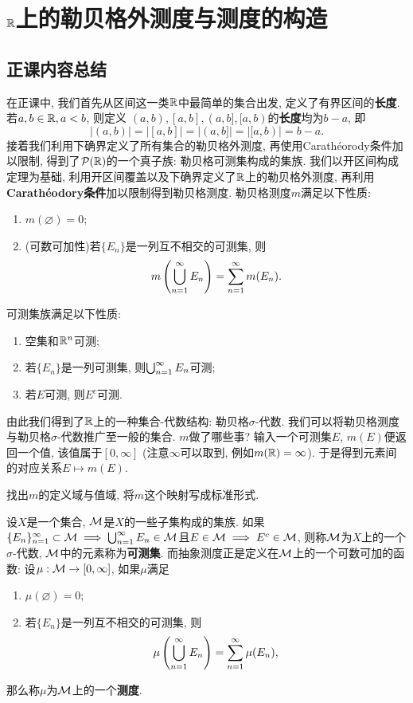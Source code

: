 \section{$\mathbb{R}$上的勒贝格外测度与测度的构造}
\subsection{正课内容总结}

在正课中, 我们首先从区间这一类$\mathbb{R}$中最简单的集合出发, 定义了有界区间的\textbf{长度}. 若$a,b \in \mathbb{R}, a < b$, 则定义
$(a,b), [a,b], (a,b], [a,b)$的\textbf{长度}均为$b-a$, 即
$$|(a,b)| = |[a,b]| = |(a,b]| = |[a,b)| = b-a. $$
接着我们利用下确界定义了所有集合的勒贝格外测度, 再使用Carath\'eorody条件加以限制, 得到了$\mathcal{P}(\mathbb{R})$的一个真子族: 勒贝格可测集构成的集族. 
我们以开区间构成定理为基础, 利用开区间覆盖以及下确界定义了$\mathbb{R}$上的勒贝格外测度, 再利用\textbf{Carath\'eodory条件}加以限制得到勒贝格测度. 勒贝格测度$m$满足以下性质:
\begin{enumerate}
    \item  $m(\varnothing) = 0$;
    \item (可数可加性)若$\{E_n\}$是一列互不相交的可测集, 则
    $$m\left(\bigcup_{n=1}^{\infty}E_n\right) = \sum_{n=1}^{\infty}m(E_n).$$
\end{enumerate}
可测集族满足以下性质:
\begin{enumerate}
    \item 空集和$\mathbb{R}^n$可测;
    \item 若$\{E_n\}$是一列可测集, 则$\bigcup_{n=1}^{\infty}E_n$可测;
    \item 若$E$可测, 则$E^c$可测.
\end{enumerate}
由此我们得到了$\mathbb{R}$上的一种集合-代数结构: 勒贝格$\sigma$-代数. 我们可以将勒贝格测度与勒贝格$\sigma$-代数推广至一般的集合. 
$m$做了哪些事? 输入一个可测集$E$, $m(E)$便返回一个值, 该值属于$[0,\infty]$ (注意$\infty$可以取到, 例如$m(\mathbb{R}) = \infty$). 
于是得到元素间的对应关系$E \mapsto m(E)$. 
\begin{exercise}
    找出$m$的定义域与值域, 将$m$这个映射写成标准形式. 
\end{exercise}
设$X$是一个集合, $\mathcal{M}$是$X$的一些子集构成的集族. 如果$\{E_n\}_{n=1}^\infty \subset \mathcal{M} \implies \bigcup_{n=1}^{\infty}E_n \in \mathcal{M}$且$E \in \mathcal{M} \implies E^c \in \mathcal{M}$, 则称$\mathcal{M}$为$X$上的一个$\sigma$-代数, $\mathcal{M}$中的元素称为\textbf{可测集}. 
而抽象测度正是定义在$\mathcal{M}$上的一个可数可加的函数: 设$\mu: \mathcal{M} \to [0, \infty]$, 如果$\mu$满足
\begin{enumerate}
    \item $\mu(\varnothing) = 0$;
    \item 若$\{E_n\}$是一列互不相交的可测集, 则
    $$\mu\left(\bigcup_{n=1}^{\infty}E_n\right) = \sum_{n=1}^{\infty}\mu(E_n),$$
\end{enumerate}
那么称$\mu$为$\mathcal{M}$上的一个\textbf{测度}.

